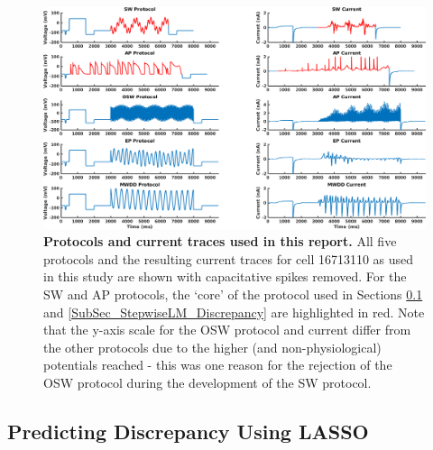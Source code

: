 \documentclass[11pt,a4paper,oneside]{article}
\begin{document}
\begin{figure}[t]
\begin{center}
\includegraphics[scale=0.42]{Figures/Protocols.png}
\caption{\textbf{Protocols and current traces used in this report.} All five protocols and the resulting current traces for cell 16713110 as used in this study are shown with capacitative spikes removed. For the SW and AP protocols, the `core' of the protocol used in Sections \ref{SubSec_Lasso_Discrepancy} and \ref{SubSec_StepwiseLM_Discrepancy} are highlighted in red. Note that the y-axis scale for the OSW protocol and current differ from the other protocols due to the higher (and non-physiological) potentials reached - this was one reason for the rejection of the OSW protocol during the development of the SW protocol.}
\label{Fig_Protocols}
\end{center}
\end{figure}

\subsection{Predicting Discrepancy Using LASSO}\label{SubSec_Lasso_Discrepancy}
\end{document}

